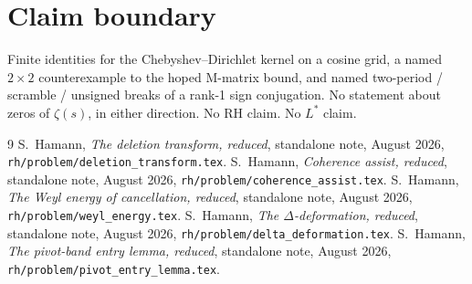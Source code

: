 \documentclass[11pt]{article}
\theoremstyle{remark}
\begin{document}
\section*{Claim boundary}

Finite identities for the Chebyshev--Dirichlet kernel on a
cosine grid, a named $2\times 2$ counterexample to the hoped
M-matrix bound, and named two-period / scramble / unsigned
breaks of a rank-1 sign conjugation.
No statement about zeros of $\zeta(s)$, in either direction.
No RH claim.  No $L^*$ claim.

\begin{thebibliography}{9}
S.~Hamann,
\textit{The deletion transform, reduced},
standalone note, August 2026,
\texttt{rh/problem/deletion\_transform.tex}.
S.~Hamann,
\textit{Coherence assist, reduced},
standalone note, August 2026,
\texttt{rh/problem/coherence\_assist.tex}.
S.~Hamann,
\textit{The Weyl energy of cancellation, reduced},
standalone note, August 2026,
\texttt{rh/problem/weyl\_energy.tex}.
S.~Hamann,
\textit{The $\Delta$-deformation, reduced},
standalone note, August 2026,
\texttt{rh/problem/delta\_deformation.tex}.
S.~Hamann,
\textit{The pivot-band entry lemma, reduced},
standalone note, August 2026,
\texttt{rh/problem/pivot\_entry\_lemma.tex}.
\end{thebibliography}
\end{document}
